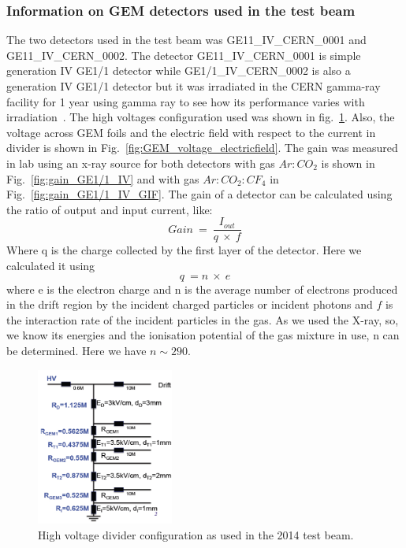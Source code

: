 \subsubsection{Information on GEM detectors used in the test beam} %
\label{ssub:information_of_gem_detectors_used_in_test_beam}
The two detectors used in the test beam was GE11\_IV\_CERN\_0001 and \\GE11\_IV\_CERN\_0002. 
The detector GE11\_IV\_CERN\_0001 is simple generation IV GE1/1 detector while GE1/1\_IV\_CERN\_0002 is also a generation IV GE1/1 detector but it was irradiated in the CERN gamma-ray facility for 1 year using gamma ray to see how its performance varies with irradiation~\cite{Merlin2013}. 
The high voltages configuration used was shown in fig.~\ref{fig:HV_configuration}. 
Also, the voltage across GEM foils and  the electric field  with respect to the current in divider is shown in Fig.~\ref{fig:GEM_voltage_electricfield}. 
The gain was measured in lab using an x-ray source for both detectors with gas $Ar:CO_2$ is shown in Fig.~\ref{fig:gain_GE1/1_IV} and with gas $Ar:CO_2:CF_4$ in Fig.~\ref{fig:gain_GE1/1_IV_GIF}. 
The gain of a detector can be calculated using the ratio of output and input current, like:
\begin{equation}
    Gain~=~\frac{I_{out}}{q~\times~f}
\end{equation}
Where q is the charge collected by the first layer of the detector. Here we calculated it using
\begin{equation}
    q~= n~\times~e
\end{equation}
where e is the electron charge and n is the average number of electrons produced in the drift region by the incident charged particles or incident photons and $f$ is the interaction rate of the incident particles in the gas. As we used the X-ray, so, we know its energies and the ionisation potential of the gas mixture in use, n can be determined. Here we have $n\sim 290$.
\begin{figure}[htbp]
    \centering
    \includegraphics[width=0.40\textwidth]{figures/GEM/HV_divider_gem_testbeam_2014.jpeg}
    \caption{High voltage divider configuration as used in the 2014 test beam.}
    \label{fig:HV_configuration}
\end{figure}
